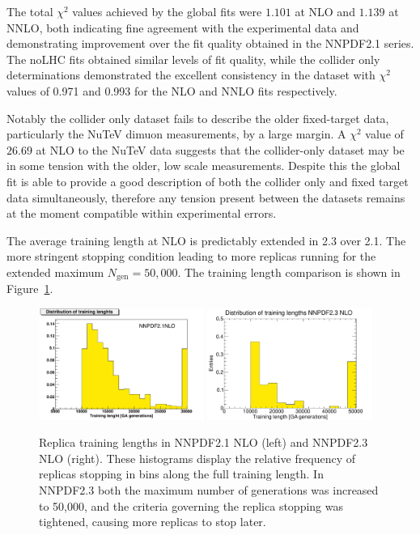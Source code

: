 The total $\chi^2$ values achieved by the global fits were $1.101$ at NLO and $1.139$ at NNLO, both indicating fine agreement with the experimental data and demonstrating improvement over the fit quality obtained in the NNPDF2.1 series. The noLHC fits obtained similar levels of fit quality, while the collider only determinations demonstrated the excellent consistency in the dataset with $\chi^2$ values of 0.971 and 0.993 for the NLO and NNLO fits respectively.

Notably the collider only dataset fails to describe the older fixed-target data, particularly the NuTeV dimuon measurements, by a large margin. A $\chi^2$ value of $26.69$ at NLO to the NuTeV data suggests that the collider-only dataset may be in some tension with the older, low scale measurements. Despite this the global fit is able to provide a good description of both the collider only and fixed target data simultaneously, therefore any tension present between the datasets remains at the moment compatible within experimental errors.

The average training length at NLO is predictably extended in 2.3 over 2.1. The more stringent stopping condition leading to more replicas running for the extended maximum $N_{\text{gen}} = 50,000$. The training length comparison is shown in Figure~\ref{fig:tlcomp}.

\begin{figure}[h!]
\centering
\includegraphics[width=0.48\textwidth]{6-LHCimpact/figs/21tl_ann.pdf}
\includegraphics[width=0.48\textwidth]{6-LHCimpact/figs/23tl.eps}
\caption[Replica training lengths in NNPDF2.1 and NNPDF2.3]{Replica training lengths in NNPDF2.1 NLO (left) and NNPDF2.3 NLO (right). These histograms display the relative frequency of replicas stopping in bins along the full training length. In NNPDF2.3 both the maximum number of generations was increased to 50,000, and the criteria governing the replica stopping was tightened, causing more replicas to stop later. } 
\label{fig:tlcomp}
\end{figure}

